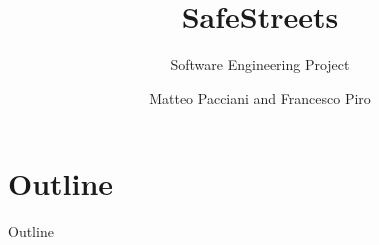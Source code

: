 

\title{\huge \textbf{SafeStreets}}
\subtitle{Software Engineering  Project}



\author{Matteo Pacciani and Francesco Piro}


	
{
	\frame{\titlepage}
}

\section*{Outline}
	\begin{frame}{Outline}
		\vspace{-1cm}
		\textbf{\tableofcontents}
	\end{frame}

\clearpage


\clearpage





